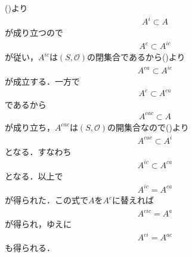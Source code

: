 	\begin{prf}
		()より
		\begin{align}
			A^i \subset A
		\end{align}
		が成り立つので
		\begin{align}
			A^c \subset A^{ic}
		\end{align}
		が従い，$A^{ic}$は$(S,\mathscr{O})$の閉集合であるから()より
		\begin{align}
			A^{ca} \subset A^{ic} 
		\end{align}
		が成立する．一方で
		\begin{align}
			A^c \subset A^{ca}
		\end{align}
		であるから
		\begin{align}
			A^{cac} \subset A
		\end{align}
		が成り立ち，$A^{cac}$は$(S,\mathscr{O})$の開集合なので()より
		\begin{align}
			A^{cac} \subset A^i
		\end{align}
		となる．すなわち
		\begin{align}
			A^{ic} \subset A^{ca}
		\end{align}
		となる．以上で
		\begin{align}
			A^{ic} = A^{ca}
		\end{align}
		が得られた．この式で$A$を$A^c$に替えれば
		\begin{align}
			A^{cic} = A^a
		\end{align}
		が得られ，ゆえに
		\begin{align}
			A^{ci} = A^{ac}
		\end{align}
		も得られる．
		\QED
	\end{prf}